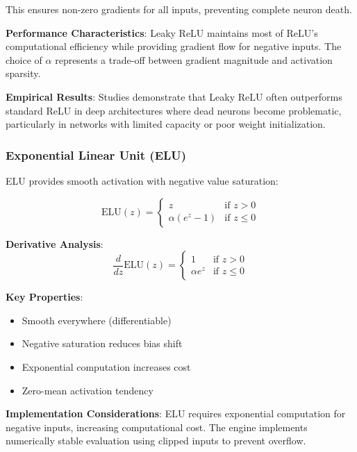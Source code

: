\documentclass[11pt,a4paper]{report}
\begin{document}
This ensures non-zero gradients for all inputs, preventing complete neuron death.

\textbf{Performance Characteristics}: Leaky ReLU maintains most of ReLU's computational efficiency while providing gradient flow for negative inputs. The choice of $\alpha$ represents a trade-off between gradient magnitude and activation sparsity.

\textbf{Empirical Results}: Studies demonstrate that Leaky ReLU often outperforms standard ReLU in deep architectures where dead neurons become problematic, particularly in networks with limited capacity or poor weight initialization.

\subsubsection{Exponential Linear Unit (ELU)}

ELU provides smooth activation with negative value saturation:

\begin{equation}
\text{ELU}(z) = \begin{cases}
z & \text{if } z > 0 \\
\alpha(e^z - 1) & \text{if } z \leq 0
\end{cases}
\end{equation}

\textbf{Derivative Analysis}:
\begin{equation}
\frac{d}{dz}\text{ELU}(z) = \begin{cases}
1 & \text{if } z > 0 \\
\alpha e^z & \text{if } z \leq 0
\end{cases}
\end{equation}

\textbf{Key Properties}:
\begin{itemize}
\item Smooth everywhere (differentiable)
\item Negative saturation reduces bias shift
\item Exponential computation increases cost
\item Zero-mean activation tendency
\end{itemize}

\textbf{Implementation Considerations}: ELU requires exponential computation for negative inputs, increasing computational cost. The engine implements numerically stable evaluation using clipped inputs to prevent overflow.
\end{document}

